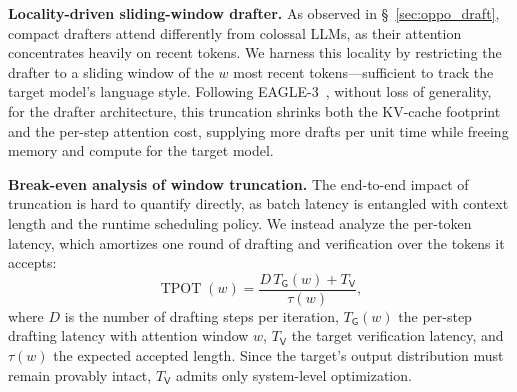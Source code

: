 \documentclass[sigconf,nonacm,10pt]{acmart}
\begin{document}

\noindent\textbf{Locality-driven sliding-window drafter.}
As observed in \S~\ref{sec:oppo_draft}, compact drafters attend differently from colossal LLMs, as their attention concentrates heavily on recent tokens. We harness this locality by restricting the drafter to a sliding window of the $w$ most recent tokens---sufficient to track the target model's language style. Following EAGLE-3~\cite{li2025eagle3}, without loss of generality, for the drafter architecture, this truncation shrinks both the KV-cache footprint and the per-step attention cost, supplying more drafts per unit time while freeing memory and compute for the target model.

\noindent\textbf{Break-even analysis of window truncation.} \label{sec:draft_analysis}
The end-to-end impact of truncation is hard to quantify directly, as batch latency is entangled with context length and the runtime scheduling policy. We instead analyze the per-token latency, which amortizes one round of drafting and verification over the tokens it accepts:
\begin{equation}
\operatorname{TPOT}(w)=\frac{D\,T_{\mathsf G}(w)+T_{\mathsf V}}{\tau(w)},
\label{equ:window_tpot}
\end{equation}
where $D$ is the number of drafting steps per iteration, $T_{\mathsf G}(w)$ the per-step drafting latency with attention window $w$, $T_{\mathsf V}$ the target verification latency, and $\tau(w)$ the expected accepted length. Since the target's output distribution must remain provably intact, $T_{\mathsf V}$ admits only system-level optimization. 
\end{document}
